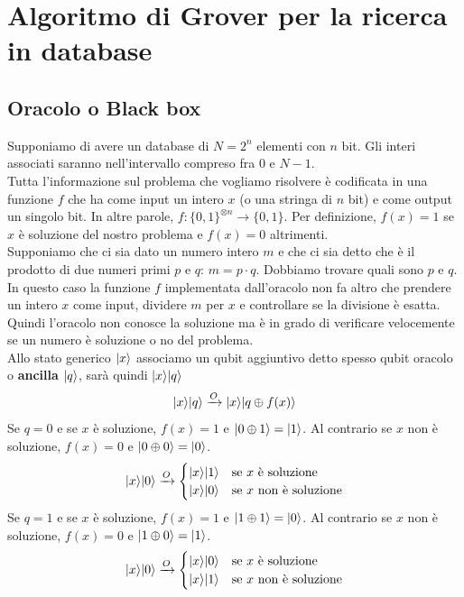 \documentclass[12pt, a4paper]{report}
\begin{document}
\section{Algoritmo di Grover per la ricerca in database}
\subsection{Oracolo o Black box}
Supponiamo di avere un database di $N=2^{n}$ elementi con $n$ bit. Gli interi associati saranno nell'intervallo compreso fra 0 e $N-1$.\\
Tutta l'informazione sul problema che vogliamo risolvere è codificata in una funzione $f$ che ha come input un intero $x$ (o una stringa di $n$ bit) e come output un singolo bit. In altre parole, $f:\{0,1\}^{\otimes n}\rightarrow\{0,1\}$. Per definizione, $f(x)=1$ se $x$ è soluzione del nostro problema e $f(x)=0$ altrimenti.\\
Supponiamo che ci sia dato un numero intero $m$ e che ci sia detto che è il prodotto di due numeri primi $p$ e $q$: $m=p\cdot q$. Dobbiamo trovare quali sono $p$ e $q$. In questo caso la funzione $f$ implementata dall'oracolo non fa  altro che prendere un intero $x$ come input, dividere $m$ per $x$ e controllare se la divisione è esatta. Quindi l'oracolo non conosce la soluzione ma è in grado di verificare velocemente se un numero è soluzione o no del problema.\\
Allo stato generico $| x \rangle$ associamo un qubit aggiuntivo detto spesso qubit oracolo o \textbf{ancilla} $| q \rangle$, sarà quindi $| x \rangle| q \rangle$
\begin{equation*}
    | x \rangle| q \rangle \xrightarrow{O} | x \rangle| q\oplus f(x) \rangle
\end{equation*}
Se $q=0$ e se $x$ è soluzione, $f(x)=1$ e $| 0\oplus 1 \rangle = | 1 \rangle$. Al contrario se $x$ non è soluzione, $f(x)=0$ e $| 0\oplus 0 \rangle = | 0 \rangle$.
\begin{equation*}
    | x \rangle| 0 \rangle\xrightarrow{O}\begin{cases}
        | x \rangle| 1 \rangle & \text{se $x$ è soluzione} \\
        | x \rangle| 0 \rangle & \text{se $x$ non è soluzione}
    \end{cases}
\end{equation*} 
Se $q=1$ e se $x$ è soluzione, $f(x)=1$ e $| 1\oplus 1 \rangle = | 0 \rangle$. Al contrario se $x$ non è soluzione, $f(x)=0$ e $| 1\oplus 0 \rangle = | 1 \rangle$.
\begin{equation*}
    | x \rangle| 0 \rangle\xrightarrow{O}\begin{cases}
        | x \rangle| 0 \rangle & \text{se $x$ è soluzione} \\
        | x \rangle| 1 \rangle & \text{se $x$ non è soluzione}
    \end{cases}
\end{equation*} 
\end{document}
